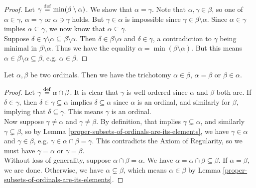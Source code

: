 \begin{proof}
    Let $\gamma \overset{\mathrm{def}}{=} \min(\beta \setminus \alpha)$. We show that $\alpha = \gamma$. Note that $\alpha,\gamma \in \beta$, so one of $\alpha \in \gamma$, $\alpha = \gamma$ or $\alpha \ni \gamma$ holds. But $\gamma \in \alpha$ is impossible since $\gamma \in \beta \setminus \alpha$. Since $\alpha \in \gamma$ implies $\alpha \subseteq \gamma$, we now know that $\alpha \subseteq \gamma$.
    \\
    
    Suppose $\delta \in \gamma \setminus \alpha \subseteq \beta \setminus \alpha$. Then $\delta \in \beta \setminus \alpha$ and $\delta \in \gamma$, a contradiction to $\gamma$ being minimal in $\beta \setminus \alpha$. Thus we have the equality $\alpha = \min(\beta \setminus \alpha)$. But this means $\alpha \in \beta \setminus \alpha \subseteq \beta$, e.g. $\alpha \in \beta$.  
\end{proof}

\begin{theorem} \label{total-ordering-of-the-ordinals}
    Let $\alpha, \beta$ be two ordinals. Then we have the trichotomy $\alpha \in \beta$, $\alpha = \beta$ or $\beta \in \alpha$.
\end{theorem}

\begin{proof}
    Let $\gamma \overset{\mathrm{def}}{=} \alpha \cap \beta$. It is clear that $\gamma$ is well-ordered since $\alpha$ and $\beta$ both are. If $\delta \in \gamma$, then $\delta \in \gamma \subseteq \alpha$ implies $\delta \subseteq \alpha$ since $\alpha$ is an ordinal, and similarly for $\beta$, implying that $\delta \subseteq \gamma$. This means $\gamma$ is an ordinal. 
    \\

    Now suppose $\gamma \neq \alpha$ and $\gamma \neq \beta$. By definition, that implies $\gamma \subsetneq \alpha$, and similarly $\gamma \subsetneq \beta$, so by Lemma \autoref{proper-subsets-of-ordinals-are-its-elements}, we have $\gamma \in \alpha$ and $\gamma \in \beta$, e.g. $\gamma \in \alpha \cap \beta = \gamma$. This contradicts the Axiom of Regularity, so we must have $\gamma = \alpha$ or $\gamma = \beta$. 
    \\

    Without loss of generality, suppose $\alpha \cap \beta = \alpha$. We have $\alpha = \alpha \cap \beta \subseteq \beta$. If $\alpha = \beta$, we are done. Otherwise, we have $\alpha \subsetneq \beta$, which means $\alpha \in \beta$ by Lemma \autoref{proper-subsets-of-ordinals-are-its-elements}.
\end{proof}

